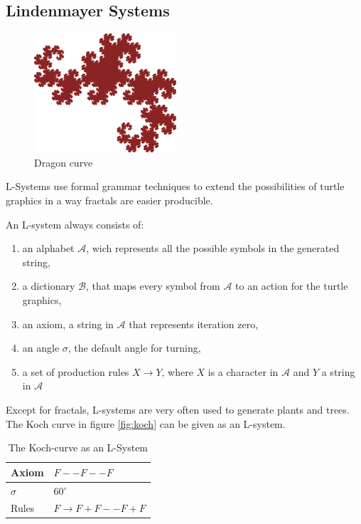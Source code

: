 \documentclass[11pt,a4paper]{article}
\newcommand{\degree}{\ensuremath{^\circ}}
\begin{document}
\subsection{Lindenmayer Systems}

\begin{figure}[h!]
  \centering
  \includegraphics[]{dragon.png}
  \caption{Dragon curve}
  \label{fig:dragon}
\end{figure}

L-Systems use formal grammar techniques to extend the possibilities of turtle graphics in a way fractals are easier producible. 

An L-system always consists of:
\begin{enumerate}
\item an alphabet $\mathcal{A}$, wich represents all the possible symbols in the generated string,
\item a dictionary $\mathcal{B}$, that maps every symbol from $\mathcal{A}$ to an action for the turtle graphics,
\item an axiom, a string in $\mathcal{A}$ that represents iteration zero,
\item an angle $\sigma$, the default angle for turning,
\item a set of production rules $X \rightarrow Y$, where $X$ is a character in $\mathcal{A}$ and $Y$ a string in $\mathcal{A}$
\end{enumerate}

Except for fractals, L-systems are very often used to generate plants and trees. The Koch curve in figure \ref{fig:koch} can be given as an L-system.

\begin{table}
\center
\begin{tabular}{l l}
Axiom & $F--F--F$ \\ \hline
$\sigma$ & 60\degree \\ \hline
Rules & $F \rightarrow F+F--F+F$ \\
\end{tabular}
\caption{The Koch-curve as an L-System}
\end{table}
\end{document}
